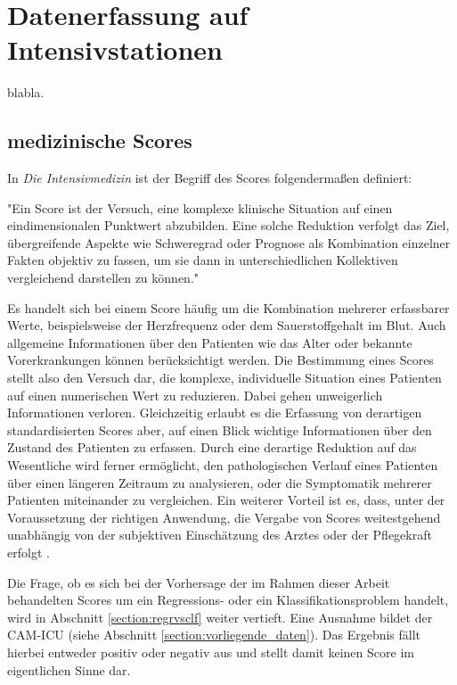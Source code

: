 \section{Datenerfassung auf Intensivstationen}

blabla. 

\subsection{medizinische Scores} \label{section:scores}

In \textit{Die Intensivmedizin} \citep{marxIntensivmedizin2015c} ist der Begriff des Scores folgendermaßen definiert:

\begin{itquote}
    "Ein Score ist der Versuch, eine komplexe klinische Situation auf einen eindimensionalen Punktwert abzubilden. Eine solche Reduktion verfolgt das Ziel, übergreifende Aspekte wie Schweregrad oder Prognose als Kombination einzelner Fakten objektiv zu fassen, um sie dann in unterschiedlichen Kollektiven vergleichend darstellen zu können."
\end{itquote}

Es handelt sich bei einem Score häufig um die Kombination mehrerer erfassbarer Werte, beispielsweise der Herzfrequenz oder dem Sauerstoffgehalt im Blut. Auch allgemeine Informationen über den Patienten wie das Alter oder bekannte Vorerkrankungen können berücksichtigt werden. Die Bestimmung eines Scores stellt also den Versuch dar, die komplexe, individuelle Situation eines Patienten auf einen numerischen Wert zu reduzieren. Dabei gehen unweigerlich Informationen verloren. Gleichzeitig erlaubt es die Erfassung von derartigen standardisierten Scores aber, auf einen Blick wichtige Informationen über den Zustand des Patienten zu erfassen. Durch eine derartige Reduktion auf das Wesentliche wird ferner ermöglicht, den pathologischen Verlauf eines Patienten über einen längeren Zeitraum zu analysieren, oder die Symptomatik mehrerer Patienten miteinander zu vergleichen. Ein weiterer Vorteil ist es, dass, unter der Voraussetzung der richtigen Anwendung, die Vergabe von Scores weitestgehend unabhängig von der subjektiven Einschätzung des Arztes oder der Pflegekraft erfolgt \citep{marxIntensivmedizin2015c}.

Die Frage, ob es sich bei der Vorhersage der im Rahmen dieser Arbeit behandelten Scores um ein Regressions- oder ein Klassifikationsproblem handelt, wird in Abschnitt \ref{section:regrvsclf} weiter vertieft. Eine Ausnahme bildet der CAM-ICU (siehe Abschnitt \ref{section:vorliegende_daten}). Das Ergebnis fällt hierbei entweder positiv oder negativ aus und stellt damit keinen Score im eigentlichen Sinne dar.

